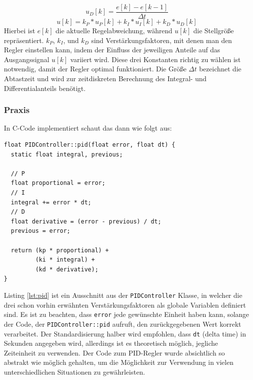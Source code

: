 \begin{equation}
    u_D[k] = \frac{e[k] - e[k-1]}{\Delta t}
\end{equation}
\begin{equation}
    u[k] = k_P * u_P[k] + k_I * u_I[k] + k_D * u_D[k]
\end{equation}
%
Hierbei ist $e[k]$ die aktuelle Regelabweichung,
während $u[k]$ die Stellgröße repräsentiert.
%
$k_P$, $k_I$, und $k_D$ sind Verstärkungsfaktoren,
mit denen man den Regler einstellen kann,
indem der Einfluss der jeweiligen Anteile
auf das Ausgangssignal $u[k]$ variiert wird.
%
Diese drei Konstanten richtig zu wählen ist notwendig,
damit der Regler optimal funktioniert.
%
Die Größe $\Delta t$ bezeichnet die Abtastzeit und wird zur zeitdiskreten
Berechnung des Integral- und Differentialanteils benötigt.

\subsubsection{Praxis}
In C-Code implementiert schaut das dann wie folgt aus:
\begin{lstlisting}[caption={Implementierung des PID-Reglers in C},label=lst:pid]
float PIDController::pid(float error, float dt) {
  static float integral, previous;

  // P
  float proportional = error;
  // I
  integral += error * dt;
  // D
  float derivative = (error - previous) / dt;
  previous = error;

  return (kp * proportional) +
         (ki * integral) +
         (kd * derivative);
}
\end{lstlisting}
Listing \ref{lst:pid} ist ein Ausschnitt aus der \texttt{PIDController} Klasse,
in welcher die drei schon vorhin erwähnten Verstärkungsfaktoren als globale Variablen definiert sind.
%  
Es ist zu beachten,
dass \texttt{error}
jede gewünschte Einheit haben kann,
solange der Code,
der \texttt{PIDController::pid} aufruft,
den zurückgegebenen Wert korrekt verarbeitet.
%
Der Standardisierung halber wird empfohlen,
dass \texttt{dt} (delta time) in Sekunden angegeben wird,
allerdings ist es theoretisch möglich,
jegliche Zeiteinheit zu verwenden. 
%
Der Code zum PID-Regler wurde absichtlich so abstrakt wie möglich gehalten,
um die Möglichkeit zur Verwendung in vielen unterschiedlichen Situationen zu gewährleisten.

